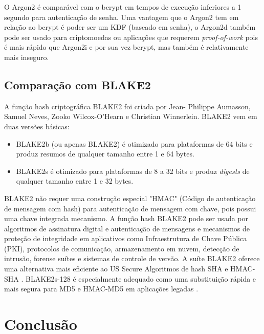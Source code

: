 \documentclass[conference]{IEEEtran}
\begin{document}
O Argon2 é comparável com o bcrypt em tempos de execução inferiores a 1 segundo para autenticação 
de senha. Uma vantagem que o Argon2 tem em relação ao bcrypt é poder ser um KDF (baseado em senha), 
o Argon2d também pode ser usado para criptomoedas ou aplicações que requerem \textit{proof-of-work} pois 
é mais rápido que Argon2i e por sua vez bcrypt, mas também é relativamente mais inseguro.

\subsection{Comparação com BLAKE2}

A função hash criptográfica BLAKE2 foi criada por Jean-
Philippe Aumasson, Samuel Neves, Zooko Wilcox-O'Hearn e Christian
Winnerlein. BLAKE2 vem em duas versões básicas:

\begin{itemize}
\item BLAKE2b (ou apenas BLAKE2) é otimizado para plataformas de 64 bits e
produz resumos de qualquer tamanho entre 1 e 64 bytes.
\item BLAKE2s é otimizado para plataformas de 8 a 32 bits e produz
\textit{digests} de qualquer tamanho entre 1 e 32 bytes.
\end{itemize}

BLAKE2 não requer uma construção especial "HMAC" (Código de autenticação de mensagem com hash)
para autenticação de mensagem com chave, pois possui uma chave integrada
mecanismo. A função hash BLAKE2 pode ser usada por algoritmos de assinatura digital
e autenticação de mensagens e mecanismos de proteção de integridade em
aplicativos como Infraestrutura de Chave Pública (PKI),
protocolos de comunicação, armazenamento em nuvem, detecção de intrusão, forense
suítes e sistemas de controle de versão. A suíte BLAKE2 oferece uma alternativa mais eficiente ao US Secure
Algoritmos de hash SHA e HMAC-SHA \cite{rfc6234}. BLAKE2s-128 é
especialmente adequado como uma substituição rápida e mais segura para
MD5 e HMAC-MD5 em aplicações legadas \cite{rfc6151}. \cite{rfc7693}

\section{Conclusão}
\end{document}
